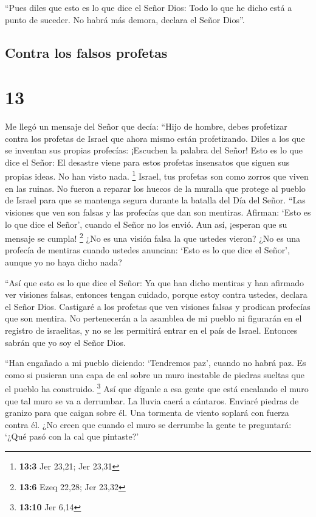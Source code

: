  ``Pues diles que esto es lo que dice el Señor Dios: Todo
lo que he dicho está a punto de suceder. No habrá más demora, declara el
Señor Dios''.

\hypertarget{contra-los-falsos-profetas}{%
\subsection{Contra los falsos
profetas}\label{contra-los-falsos-profetas}}

\hypertarget{section-12}{%
\section{13}\label{section-12}}

 Me llegó un mensaje del Señor que decía: 
``Hijo de hombre, debes profetizar contra los profetas de Israel que
ahora mismo están profetizando. Diles a los que se inventan sus propias
profecías: ¡Escuchen la palabra del Señor!  Esto es lo que
dice el Señor: El desastre viene para estos profetas insensatos que
siguen sus propias ideas. No han visto nada. \footnote{\textbf{13:3} Jer
  23,21; Jer 23,31}  Israel, tus profetas son como zorros
que viven en las ruinas.  No fueron a reparar los huecos
de la muralla que protege al pueblo de Israel para que se mantenga
segura durante la batalla del Día del Señor.  ``Las
visiones que ven son falsas y las profecías que dan son mentiras.
Afirman: `Esto es lo que dice el Señor', cuando el Señor no los envió.
Aun así, ¡esperan que su mensaje se cumpla! \footnote{\textbf{13:6} Ezeq
  22,28; Jer 23,32}  ¿No es una visión falsa la que
ustedes vieron? ¿No es una profecía de mentiras cuando ustedes anuncian:
`Esto es lo que dice el Señor', aunque yo no haya dicho nada?

 ``Así que esto es lo que dice el Señor: Ya que han dicho
mentiras y han afirmado ver visiones falsas, entonces tengan cuidado,
porque estoy contra ustedes, declara el Señor Dios. 
Castigaré a los profetas que ven visiones falsas y prodican profecías
que son mentira. No pertenecerán a la asamblea de mi pueblo ni figurarán
en el registro de israelitas, y no se les permitirá entrar en el país de
Israel. Entonces sabrán que yo soy el Señor Dios.

 ``Han engañado a mi pueblo diciendo: `Tendremos paz',
cuando no habrá paz. Es como si pusieran una capa de cal sobre un muro
inestable de piedras sueltas que el pueblo ha construido. \footnote{\textbf{13:10}
  Jer 6,14}  Así que díganle a esa gente que está
encalando el muro que tal muro se va a derrumbar. La lluvia caerá a
cántaros. Enviaré piedras de granizo para que caigan sobre él. Una
tormenta de viento soplará con fuerza contra él.  ¿No
creen que cuando el muro se derrumbe la gente te preguntará: `¿Qué pasó
con la cal que pintaste?'

